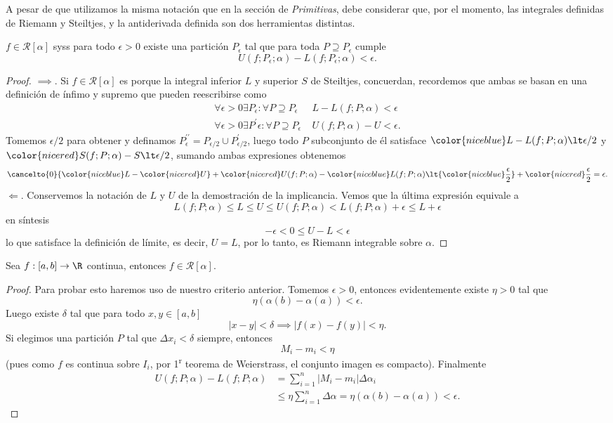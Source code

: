 \documentclass[11pt,oneside,a4paper]{book}
\begin{document}
A pesar de que utilizamos la misma notación que en la sección de \textit{Primitivas}, debe considerar que, por el momento, las integrales definidas de Riemann y Steiltjes, y la antiderivada definida son dos herramientas distintas.
\begin{thm}
$f\in\mathscr{R}[\alpha]$ syss para todo $\epsilon\gt 0$ existe una partición $P_\epsilon$ tal que para toda $P\supseteq P_\epsilon$ cumple
$$U(f;P_\epsilon;\alpha)-L(f;P_\epsilon;\alpha)\lt\epsilon.$$
\end{thm}
\begin{proof}
$\implies$. Si $f\in\mathscr{R}[\alpha]$ es porque la integral inferior $L$ y superior $S$ de Steiltjes, concuerdan, recordemos que ambas se basan en una definición de ínfimo y supremo que pueden reescribirse como
\begin{align*}
\forall\epsilon\gt 0\exists P_\epsilon:\forall P\supseteq P_\epsilon&\;L-L(f;P;\alpha)\lt\epsilon\\
\forall\epsilon\gt 0\exists P^\prime\epsilon:\forall P\supseteq P_\epsilon&\;U(f;P;\alpha)-U\lt\epsilon.
\end{align*}
Tomemos $\epsilon/2$ para obtener y definamos $P^{\prime\prime}_\epsilon=P_{\epsilon/2}\cup P^\prime_{\epsilon/2}$, luego todo $P$ subconjunto de él satisface $ \color{niceblue}L-L(f;P;\alpha)\lt\epsilon/2$ y $\color{nicered}S(f;P;\alpha)-S\lt\epsilon/2$, sumando ambas expresiones obtenemos
$$\cancelto{0}{{\color{niceblue}L}-{\color{nicered}U}}+{\color{nicered}U(f;P;\alpha)}-{\color{niceblue}L(f;P;\alpha)}\lt{\color{niceblue}\frac{\epsilon}{2}}+{\color{nicered}\frac{\epsilon}{2}}=\epsilon.$$
$\Longleftarrow$. Conservemos la notación de $L$ y $U$ de la demostración de la implicancia. Vemos que la última expresión equivale a 
$$L(f;P;\alpha)\leq L\leq U\leq U(f;P;\alpha)\lt L(f;P;\alpha)+\epsilon\leq L+\epsilon$$
en síntesis
$$-\epsilon\lt 0\leq U-L\lt\epsilon$$
lo que satisface la definición de límite, es decir, $U=L$, por lo tanto, es Riemann integrable sobre $\alpha$.
\end{proof}
\begin{thm}
Sea $f:[a,b]\rightarrow\R$ continua, entonces $f\in\mathscr{R}[\alpha]$.
\end{thm}
\begin{proof}
Para probar esto haremos uso de nuestro criterio anterior. Tomemos $\epsilon\gt 0$, entonces evidentemente existe $\eta\gt 0$ tal que
$$\eta(\alpha(b)-\alpha(a))\lt\epsilon.$$
Luego existe $\delta$ tal que para todo $x,y\in[a,b]$
$$|x-y|\lt\delta\implies|f(x)-f(y)|\lt\eta.$$
Si elegimos una partición $P$ tal que $\Delta x_i\lt\delta$ siempre, entonces
$$M_i-m_i\lt\eta$$
(pues como $f$ es continua sobre $I_i$, por 1\textsuperscript{r} teorema de Weierstrass, el conjunto imagen es compacto). Finalmente
\begin{align*}
U(f;P;\alpha)-L(f;P;\alpha)&=\sum_{i=1}^n|M_i-m_i|\Delta\alpha_i\\
&\leq\eta\sum_{i=1}^n\Delta\alpha=\eta(\alpha(b)-\alpha(a))\lt\epsilon.
\end{align*}
\end{proof}
\end{document}
